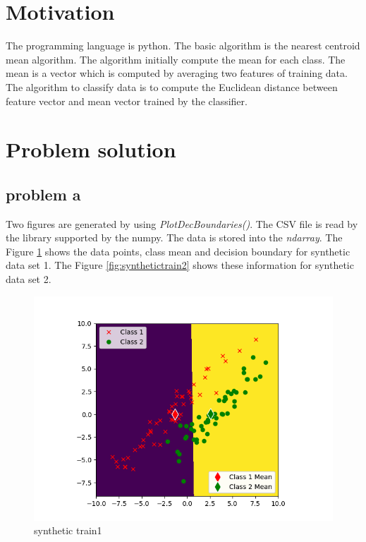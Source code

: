 \documentclass{article}
\begin{document}
	\section{Motivation}
	The programming language is python. The basic algorithm is the nearest centroid mean algorithm. The algorithm initially compute the mean for each class. The mean is a vector which is computed by averaging two features of training data. The algorithm to classify data is to compute the Euclidean distance between feature vector and  mean vector trained by the classifier. 
	
	\section{Problem solution}
	\subsection{problem a}
	Two figures are generated by using \textit{PlotDecBoundaries()}. The CSV file is read by the library supported by the numpy. The data is stored into the \textit{ndarray}.  The Figure \ref{fig:synthetictrain1} shows the data points, class mean and decision boundary for synthetic data set 1. The Figure \ref{fig:synthetictrain2} shows these information for synthetic data set 2. 
	\begin{figure}[hbt!]
		\includegraphics[width=\linewidth]{images/synthetic_trian1.png}	
		\caption{synthetic train1}
		\label{fig:synthetictrain1}
	\end{figure}
\end{document}
